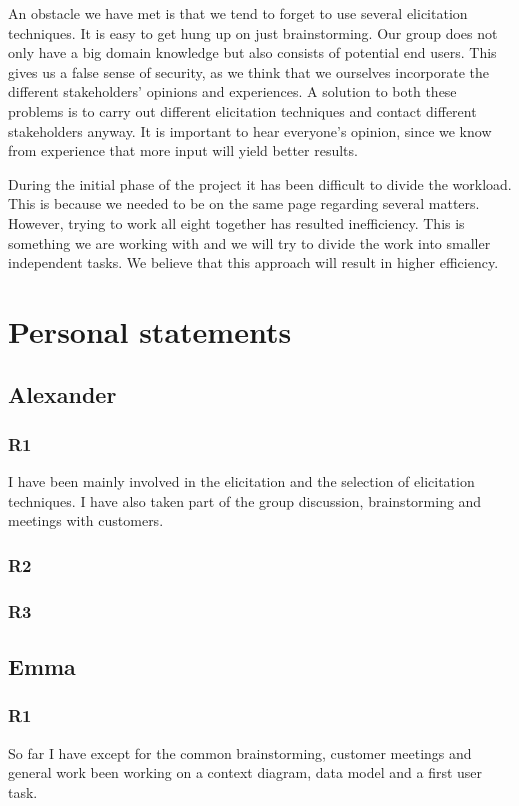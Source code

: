 \documentclass[a4paper]{article}
\begin{document}
An obstacle we have met is that we tend to forget to use several elicitation techniques. It is easy to get hung up on just brainstorming. Our group does not only have a big domain knowledge but also consists of potential end users. This gives us a false sense of security, as we think that we ourselves incorporate the different stakeholders' opinions and experiences. A solution to both these problems is to carry out different elicitation techniques and contact different stakeholders anyway. It is important to hear everyone's opinion, since we know from experience that more input will yield better results.

During the initial phase of the project it has been difficult to divide the workload. This is because we needed to be on the same page regarding several matters. However, trying to work all eight together has resulted inefficiency. This is something we are working with and we will try to divide the work into smaller independent tasks. We believe that this approach will result in higher efficiency.


  \section{Personal statements}
  
  \subsection{Alexander}
    \subsubsection{R1}
    I have been mainly involved in the elicitation and the selection of elicitation techniques. I have also taken part of the group discussion, brainstorming and meetings with customers.
    \subsubsection{R2}
    \subsubsection{R3}
  
  \subsection{Emma}
    \subsubsection{R1}
    So far I have except for the common brainstorming, customer meetings and general work been working on a context diagram, data model and a first user task.
\end{document}
